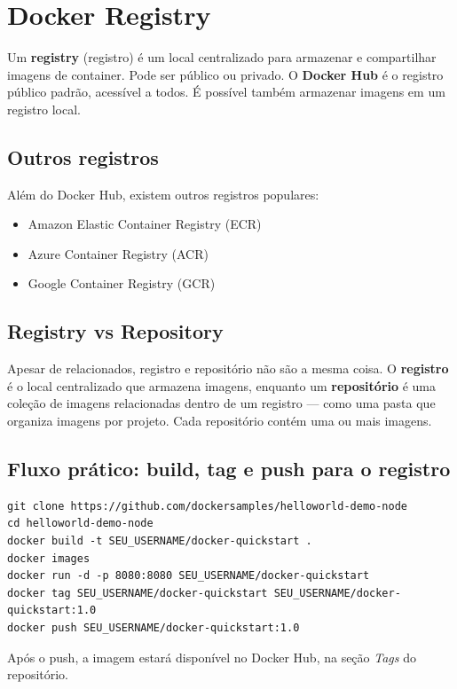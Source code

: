\section{Docker Registry}

Um \textbf{registry} (registro) é um local centralizado para armazenar e compartilhar imagens de container. Pode ser público ou privado. O \textbf{Docker Hub} é o registro público padrão, acessível a todos. É possível também armazenar imagens em um registro local.

\subsection{Outros registros}

Além do Docker Hub, existem outros registros populares:

\begin{itemize}
    \item Amazon Elastic Container Registry (ECR)
    \item Azure Container Registry (ACR)
    \item Google Container Registry (GCR)
\end{itemize}

\subsection{Registry vs Repository}

Apesar de relacionados, registro e repositório não são a mesma coisa. O \textbf{registro} é o local centralizado que armazena imagens, enquanto um \textbf{repositório} é uma coleção de imagens relacionadas dentro de um registro --- como uma pasta que organiza imagens por projeto. Cada repositório contém uma ou mais imagens.

\subsection{Fluxo prático: build, tag e push para o registro}

\begin{verbatim}
git clone https://github.com/dockersamples/helloworld-demo-node
cd helloworld-demo-node
docker build -t SEU_USERNAME/docker-quickstart .
docker images
docker run -d -p 8080:8080 SEU_USERNAME/docker-quickstart
docker tag SEU_USERNAME/docker-quickstart SEU_USERNAME/docker-quickstart:1.0
docker push SEU_USERNAME/docker-quickstart:1.0
\end{verbatim}

Após o push, a imagem estará disponível no Docker Hub, na seção \textit{Tags} do repositório.
